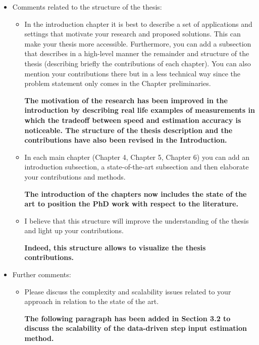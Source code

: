 \documentclass[11pt]{article}
\begin{document}
\begin{itemize}
    \item Comments related to the structure of the thesis:
    \begin{itemize}
	\item In the introduction chapter it is best to describe a set of applications and settings that motivate your research and proposed solutions. This can make your thesis more accessible. Furthermore, you can add a subsection that describes in a high-level manner the remainder and structure of the thesis (describing briefly the contributions of each chapter). You can also mention your contributions there but in a less technical way since the problem statement only comes in the Chapter preliminaries.
	
	{\bfseries The motivation of the research has been improved in the introduction by describing real life examples of measurements in which the tradeoff between speed and estimation accuracy is noticeable. The structure of the thesis description and the contributions have also been revised in the Introduction. }
	
	\item In each main chapter (Chapter 4, Chapter 5, Chapter 6) you can add an introduction subsection, a state-of-the-art subsection and then elaborate your contributions and methods.
    
    {\bfseries The introduction of the chapters now includes the state of the art to position the PhD work with respect to the literature.}

	\item I believe that this structure will improve the understanding of the thesis and light up your contributions.
	
	{\bfseries Indeed, this structure allows to visualize the thesis contributions.}

	\end{itemize}
	\item Further comments:
	\begin{itemize}
	\item Please discuss the complexity and scalability issues related to your approach in relation to the state of the art.
	
    {\bfseries The following paragraph has been added in Section 3.2 to discuss the scalability of the data-driven step input estimation method.}
	

\end{itemize}
\end{itemize}
\end{document}
